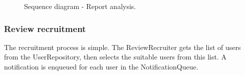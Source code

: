 \begin{figure}[H]
    \centering
    \caption{\label{fig:sequence-report-analysis}Sequence diagram - Report analysis.}
\end{figure}

\subsubsection{Review recruitment}
The recruitment process is simple. The ReviewRecruiter gets the list of users from the UserRepository, then selects the suitable users from this list. A notification is enqueued for each user in the NotificationQueue.

